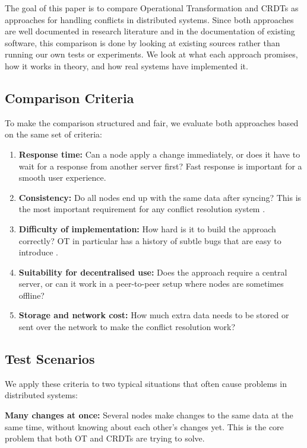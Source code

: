The goal of this paper is to compare Operational Transformation and CRDTs as approaches for handling
conflicts in distributed systems. Since both approaches are well documented in research literature and in
the documentation of existing software, this comparison is done by looking at existing sources rather than
running our own tests or experiments. We look at what each approach promises, how it works in theory, and
how real systems have implemented it.

\subsection{Comparison Criteria}

To make the comparison structured and fair, we evaluate both approaches based on the same set of criteria:

\begin{enumerate}
    \item \textbf{Response time:} Can a node apply a change immediately, or does it have to wait for a
    response from another server first? Fast response is important for a smooth user experience.
    \item \textbf{Consistency:} Do all nodes end up with the same data after syncing? This is the most
    important requirement for any conflict resolution system \cite{shapiro2011comprehensive}.
    \item \textbf{Difficulty of implementation:} How hard is it to build the approach correctly? OT in
    particular has a history of subtle bugs that are easy to introduce \cite{nichols1995jupiter}.
    \item \textbf{Suitability for decentralised use:} Does the approach require a central server, or can
    it work in a peer-to-peer setup where nodes are sometimes offline?
    \item \textbf{Storage and network cost:} How much extra data needs to be stored or sent over the
    network to make the conflict resolution work?
\end{enumerate}

\subsection{Test Scenarios}

We apply these criteria to two typical situations that often cause problems in distributed systems:

\textbf{Many changes at once:} Several nodes make changes to the same data at the same time, without
knowing about each other's changes yet. This is the core problem that both OT and CRDTs are trying to solve.

